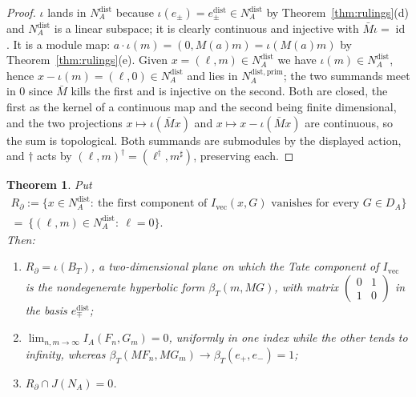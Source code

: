 \documentclass[11pt]{amsart}
\newtheorem{theorem}{Theorem}[section]
\theoremstyle{definition}
\theoremstyle{remark}
\newcommand{\id}{\operatorname{id}}
\newcommand{\DA}{D_A}
\newcommand{\BT}{B_T}
\newcommand{\NAd}{N_A^{\mathrm{dist}}}
\begin{document}
\begin{proof}
$\iota$ lands in $\NAd$ because $\iota(e_{\pm})=e_{\pm}^{\mathrm{dist}}\in\NAd$ by
Theorem~\ref{thm:rulings}(d) and $\NAd$ is a linear subspace; it is clearly
continuous and injective with $\bar M\iota=\id$.  It is a module map:
$a\cdot \iota(m)=(0,M(a)m)=\iota(M(a)m)$ by Theorem~\ref{thm:rulings}(e).  Given
$x=(\ell,m)\in\NAd$ we have $\iota(m)\in\NAd$, hence $x-\iota(m)=(\ell,0)\in\NAd$ and
lies in $N_A^{\mathrm{dist,prim}}$; the two summands meet in $0$ since $\bar M$
kills the first and is injective on the second.  Both are closed, the first as
the kernel of a continuous map and the second being finite dimensional, and
the two projections $x\mapsto \iota(\bar Mx)$ and $x\mapsto x-\iota(\bar Mx)$ are
continuous, so the sum is topological.  Both summands are submodules by the
displayed action, and $\dagger$ acts by $(\ell,m)^{\dagger}=(\ell^{\dagger},
m^{\sharp})$, preserving each.
\end{proof}

\begin{theorem}\label{thm:rulnull}
Put
\begin{multline}\label{eq:Rboundary}
R_{\partial}:=\bigl\{x\in\NAd:\ \text{the first component of }
I_{\mathrm{vec}}(x,G)\text{ vanishes for every }G\in\DA\bigr\}
\\
=\ \bigl\{(\ell,m)\in\NAd:\ \ell=0\bigr\}.
\end{multline}
Then:
\begin{enumerate}
\item[(a)] $R_{\partial}=\iota(\BT)$, a two-dimensional plane on which the Tate
component of $I_{\mathrm{vec}}$ is the nondegenerate hyperbolic form
$\beta_T(m,MG)$, with matrix
$\left(\begin{smallmatrix}0&1\\1&0\end{smallmatrix}\right)$ in the basis
$e_{\mp}^{\mathrm{dist}}$;
\item[(b)] $\lim_{n,m\to\infty}I_A(F_n,G_m)=0$, uniformly in one index while
the other tends to infinity, whereas
$\beta_T(MF_n,MG_m)\to\beta_T(e_+,e_-)=1$;
\item[(c)] $R_{\partial}\cap J(N_A)=0$.
\end{enumerate}
\end{theorem}
\end{document}
